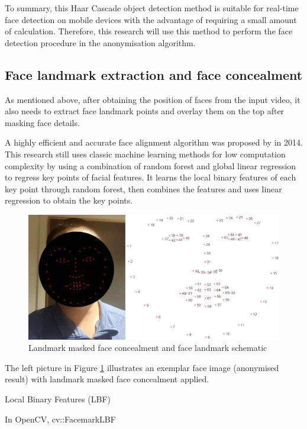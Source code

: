 To summary, this Haar Cascade object detection method is suitable for real-time face detection on mobile devices with the advantage of requiring a small amount of calculation. 
Therefore, this research will use this method to perform the face detection procedure in the anonymisation algorithm.

\subsection{Face landmark extraction and face concealment} %
As mentioned above, after obtaining the position of faces from the input video, it also needs to extract face landmark points and overlay them on the top after masking face details.

A highly efficient and accurate face alignment algorithm was proposed by \citet{ren2014face} in 2014.
This research still uses classic machine learning methods for low computation complexity by using a combination of random forest and global linear regression to regress key points of facial features.
It learns the local binary features of each key point through random forest, then combines the features and uses linear regression to obtain the key points.

\begin{figure}[!ht]
    \centering
    \includegraphics[width=\textwidth]{design/imgs/3-face-landmark.png}
    \caption{Landmark masked face concealment and face landmark schematic}
    \label{fig:3-face-landmark}
\end{figure}

The left picture in Figure \ref{fig:3-face-landmark} illustrates an exemplar face image (anonymised result) with landmark masked face concealment applied.


Local Binary Features (LBF)

\citet{casado2021real}

In OpenCV, cv::FacemarkLBF